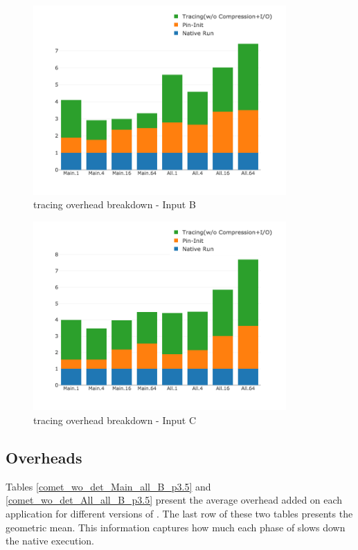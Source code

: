   

\begin{figure}[t]
\centering
\includegraphics[width=3.8in]{figs.comet.newMed/comet_chartDet_B_woc_byTool_p3_5.png}
\caption{\parlotnc tracing overhead breakdown - Input B}
\label{comet_chartDet_B_woc_byTool_p3_5}
\end{figure}

\begin{figure}[t]
\centering
\includegraphics[width=3.8in]{figs.comet.newMed/comet_chartDet_C_woc_byTool_p3_5.png}
\caption{ \parlotnc tracing overhead breakdown - Input C}
\label{comet_chartDet_C_woc_byTool_p3_5}
\end{figure}

  
\subsection{Overheads} 
\label{subsec:pinit}
Tables \ref{comet_wo_det_Main_all_B_p3.5} and
\ref{comet_wo_det_All_all_B_p3.5} present the average overhead added on each
application for different versions of \parlot. 
%
The last row of these two tables
presents the geometric mean.
%
This information captures how much each
phase of \parlot slows down the native execution. 

